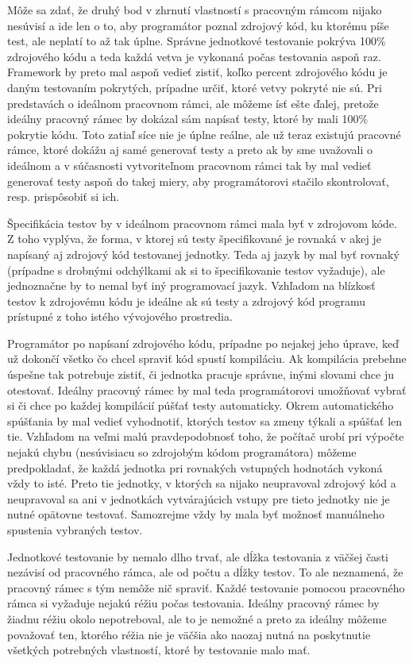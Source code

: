 \documentclass[11pt,twoside,slovak,a4paper]{article}
\begin{document}
		Môže sa zdať, že druhý bod v zhrnutí vlastností s pracovným rámcom nijako nesúvisí a ide len o to, aby programátor poznal zdrojový kód, ku ktorému píše test, ale neplatí to až tak úplne. Správne jednotkové testovanie pokrýva 100\% zdrojového kódu a teda každá vetva je vykonaná počas testovania aspoň raz. Framework by preto mal aspoň vedieť zistiť, koľko percent zdrojového kódu je daným testovaním pokrytých, prípadne určiť, ktoré vetvy pokryté nie sú. Pri predstavách o ideálnom pracovnom rámci, ale môžeme ísť ešte ďalej, pretože ideálny pracovný rámec by dokázal sám napísať testy, ktoré by mali 100\% pokrytie kódu. Toto zatiaľ síce nie je úplne reálne, ale už teraz existujú pracovné rámce, ktoré dokážu aj samé generovať testy a preto ak by sme uvažovali o ideálnom a v súčasnosti vytvoriteľnom pracovnom rámci tak by mal vedieť generovať testy aspoň do takej miery, aby programátorovi stačilo skontrolovať, resp. prispôsobiť si ich.
		
		Špecifikácia testov by v ideálnom pracovnom rámci mala byť v zdrojovom kóde. Z toho vyplýva, že forma, v ktorej sú testy špecifikované je rovnaká v akej je napísaný aj zdrojový kód testovanej jednotky. Teda aj jazyk by mal byť rovnaký (prípadne s drobnými odchýlkami ak si to špecifikovanie testov vyžaduje), ale jednoznačne by to nemal byť iný programovací jazyk. Vzhľadom na blízkosť testov k zdrojovému kódu je ideálne ak sú testy a zdrojový kód programu prístupné z toho istého vývojového prostredia.
		
		Programátor po napísaní zdrojového kódu, prípadne po nejakej jeho úprave, keď už dokončí všetko čo chcel spraviť kód spustí kompiláciu. Ak kompilácia prebehne úspešne tak potrebuje zistiť, či jednotka pracuje správne, inými slovami chce ju otestovať. Ideálny pracovný rámec by mal teda programátorovi umožňovať vybrať si či chce po každej kompilácií púšťať testy automaticky. Okrem automatického spúšťania by mal vedieť vyhodnotiť, ktorých testov sa zmeny týkali a spúšťať len tie. Vzhľadom na veľmi malú pravdepodobnosť toho, že počítač urobí pri výpočte nejakú chybu (nesúvisiacu so zdrojobým kódom programátora) môžeme predpokladať, že každá jednotka pri rovnakých vstupných hodnotách vykoná vždy to isté. Preto tie jednotky, v ktorých sa nijako neupravoval zdrojový kód a neupravoval sa ani v jednotkách vytvárajúcich vstupy pre tieto jednotky nie je nutné opätovne testovať. Samozrejme vždy by mala byť možnosť manuálneho spustenia vybraných testov.
				
		Jednotkové testovanie by nemalo dlho trvať, ale dĺžka testovania z väčšej časti nezávisí od pracovného rámca, ale od počtu a dĺžky testov. To ale neznamená, že pracovný rámec s tým nemôže nič spraviť. Každé testovanie pomocou pracovného rámca si vyžaduje nejakú réžiu počas testovania. Ideálny pracovný rámec by žiadnu réžiu okolo nepotreboval, ale to je nemožné a preto za ideálny môžeme považovať ten, ktorého réžia nie je väčšia ako naozaj nutná na poskytnutie všetkých potrebných vlastností, ktoré by testovanie malo mať. 
		
\end{document}
